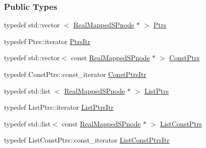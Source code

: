 \subsubsection*{\-Public \-Types}
\begin{DoxyCompactItemize}
\item 
typedef std\-::vector\*
$<$ \hyperlink{classsubpavings_1_1RealMappedSPnode}{\-Real\-Mapped\-S\-Pnode} $\ast$ $>$ \hyperlink{classsubpavings_1_1RealMappedSPnode_a9591975c77c7e7da92bbdcdf62a74d1a}{\-Ptrs}
\item 
typedef \-Ptrs\-::iterator \hyperlink{classsubpavings_1_1RealMappedSPnode_a8414841542df48678ae521df3ae92800}{\-Ptrs\-Itr}
\item 
typedef std\-::vector$<$ const \*
\hyperlink{classsubpavings_1_1RealMappedSPnode}{\-Real\-Mapped\-S\-Pnode} $\ast$ $>$ \hyperlink{classsubpavings_1_1RealMappedSPnode_a5fc20ec0cd33f031e874f50251156e65}{\-Const\-Ptrs}
\item 
typedef \-Const\-Ptrs\-::const\-\_\-iterator \hyperlink{classsubpavings_1_1RealMappedSPnode_a528463bd540e2e3d4dc907ce78a3b03c}{\-Const\-Ptrs\-Itr}
\item 
typedef std\-::list\*
$<$ \hyperlink{classsubpavings_1_1RealMappedSPnode}{\-Real\-Mapped\-S\-Pnode} $\ast$ $>$ \hyperlink{classsubpavings_1_1RealMappedSPnode_a13d2adc6fa08d7b1e70a7956eac1affe}{\-List\-Ptrs}
\item 
typedef \-List\-Ptrs\-::iterator \hyperlink{classsubpavings_1_1RealMappedSPnode_ad10e24d2efdb436ae6f65306c8ff736e}{\-List\-Ptrs\-Itr}
\item 
typedef std\-::list$<$ const \*
\hyperlink{classsubpavings_1_1RealMappedSPnode}{\-Real\-Mapped\-S\-Pnode} $\ast$ $>$ \hyperlink{classsubpavings_1_1RealMappedSPnode_aba04df267c93463fbb6a90d85e11b627}{\-List\-Const\-Ptrs}
\item 
typedef \*
\-List\-Const\-Ptrs\-::const\-\_\-iterator \hyperlink{classsubpavings_1_1RealMappedSPnode_ac4e7b7e57068590fc47a5951453754b2}{\-List\-Const\-Ptrs\-Itr}
\end{DoxyCompactItemize}
